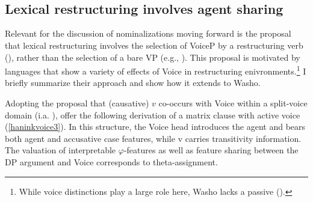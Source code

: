 \documentclass[output=paper]{langscibook}
\begin{document}
\begin{minipage}[t]{2.5in}
 \label{haninkvoice}\

\vspace{0em}\hspace{0em}

\z 

\end{minipage}\begin{minipage}[t]{3in}
 \label{haninkvoice2}\

\vspace{0em}\hspace{0em}

\z 

\end{minipage}

\subsection{Lexical restructuring involves agent sharing}\label{haninksec:agent}

Relevant for the discussion of nominalizations moving forward is the proposal that lexical restructuring involves the selection of VoiceP by a restructuring verb (\citealt{wurmbrand2015,WurmbrandShimamura2017}), rather than the selection of a bare VP (e.g., \citealt{wurmbrand2001,Wurmbrand2004}).
This proposal is motivated by languages that show a variety of effects of Voice in restructuring enivronments.\footnote{While voice distinctions play a large role here, Washo lacks a passive (\citealt{jacobsen1979}).} I briefly summarize their approach and show how it extends to Washo. 

Adopting the proposal that (causative) $v$ co-occurs with Voice within a split-voice domain (i.a. \citealt{bowers2002,folliharley2005,alexiadouetal2006,marantz2008}),  \cite{WurmbrandShimamura2017} offer the following derivation of a matrix clause with active voice (\ref{haninkvoice3}). In this structure, the Voice head introduces the agent and bears both agent and accusative case features, while v carries transitivity information. The valuation of interpretable $\varphi$-features as well as feature sharing between the DP argument and Voice corresponds to theta-assignment.
 
\end{document}
